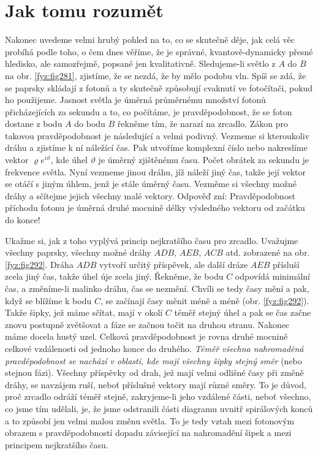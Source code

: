   \section{Jak tomu rozumět}\label{fyz:IchapXXVIsecVI}
    Nakonec uvedeme velmi hrubý pohled na to, co se skutečně děje, jak celá věc probíhá podle toho, 
    o čem dnes věříme, že je správné, kvantově-dynamicky přesné hledisko, ale samozřejmě, popsané 
    jen kvalitativně. Sledujeme-li světlo z \(A\) do \(B\) na obr. \ref{fyz:fig281}, zjistíme, že 
    se nezdá, že by mělo podobu vln. Spíš se zdá, že se paprsky skládají z fotonů a ty skutečně 
    způsobují cvaknutí ve fotočítači, pokud ho použijeme. Jasnost světla je úměrná průměrnému 
    množství fotonů přicházejících za sekundu a to, co počítáme, je pravděpodobnost, že se foton 
    dostane z bodu \(A\) do bodu \(B\) řekněme tím, že narazí na zrcadlo. Zákon pro takovou 
    pravděpodobnost je následující a velmi podivný. Vezmeme si kteroukoliv dráhu a zjistíme k ní 
    náležící čas. Pak utvoříme komplexní číslo nebo nakreslíme vektor \(\varrho e^{i\vartheta}\), 
    kde úhel \(\vartheta\) je úměrný zjištěnému času. Počet obrátek za sekundu je frekvence 
    světla. Nyní vezmeme jinou dráhu, jíž náleží jiný čas, takže její vektor se otáčí s jiným 
    úhlem, jenž je stále úměrný času. Vezměme si všechny možné dráhy a sčítejme jejich všechny malé 
    vektory. Odpověď zní: Pravděpodobnost příchodu fotonu je úměrná druhé mocnině délky výsledného 
    vektoru od začátku do konce!
    
    Ukažme si, jak z toho vyplývá princip nejkratšího času pro zrcadlo. Uvažujme všechny paprsky, 
    všechny možné dráhy \(ADB\), \(AEB\), \(ACB\) atd. zobrazené na obr. \ref{fyz:fig292}. Dráha 
    \(ADB\) vytvoří určitý příspěvek, ale další dráze \(AEB\) přísluší zcela jiný čas, takže úhel 
    úje zcela jiný. Řekněme, že bodu \(C\) odpovídá minimální čas, a změníme-li malinko dráhu, čas 
    se nezmění. Chvíli se tedy časy mění a pak, když se blížíme k bodu \(C\), se začínají časy 
    měnit méně a méně (obr. \ref{fyz:fig292}). Takže šipky, jež máme sčítat, mají v okolí \(C\) 
    téměř stejný úhel a pak se čas začne znovu postupně zvětšovat a fáze se začnou točit na druhou 
    stranu. Nakonec máme docela hustý uzel. Celková pravděpodobnost je rovna druhé mocnině celkové 
    vzdálenosti od jednoho konce do druhého. \emph{Téměř všechna nahromaděná pravděpodobnost se 
    nachází v oblasti, kde mají všechny šipky stejný směr} (nebo stejnou fázi). Všechny příspěvky 
    od drah, jež mají velmi odlišné časy při změně dráhy, se navzájem ruší, neboť příslušné vektory 
    mají různé směry. To je důvod, proč zrcadlo odráží téměř stejně, zakryjeme-li jeho vzdálené 
    části, neboť všechno, co jsme tím udělali, je, že jsme odstranili části diagramu uvnitř 
    spirálových konců a to způsobí jen velmi malou změnu světla. To je tedy vztah mezi fotonovým 
    obrazem s pravděpodobností dopadu závisející na nahromadění šipek a mezi principem nejkratšího 
    času.
    
